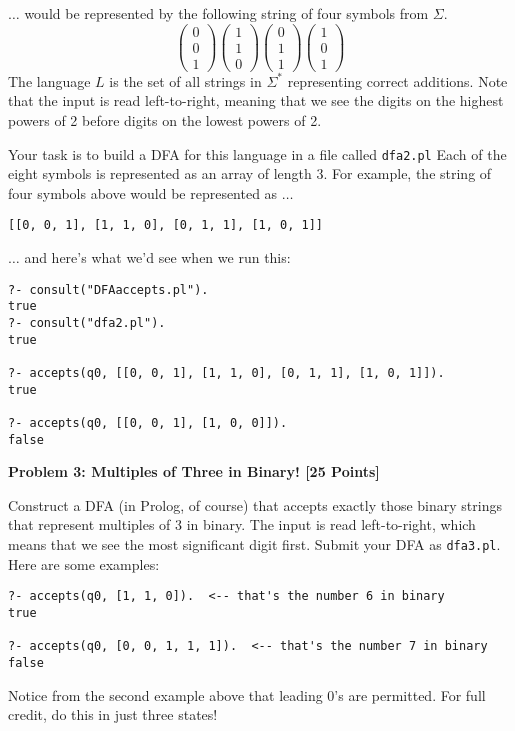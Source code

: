 \documentclass[12pt]{article}
\newcommand{\Problem}[3]{\mbox{} \newline \noindent \textbf{\textbf{Problem #1: #2 [#3 Points] \\ }}}
\begin{document}
$\dots$ would be represented by the following string of four symbols from 
$\Sigma$.
\[
\left( \begin{array}{c} 0 \\ 0 \\ 1 \end{array} \right)
\left( \begin{array}{c} 1 \\ 1 \\ 0 \end{array} \right)
\left( \begin{array}{c} 0 \\ 1 \\ 1 \end{array} \right)
\left( \begin{array}{c} 1 \\ 0 \\ 1 \end{array} \right)
\]
The language $L$ is the set of all strings in $\Sigma^{*}$ representing
correct additions.  Note that the input is read left-to-right, meaning that we see the digits on the highest powers of 2 before digits on the lowest powers of 2.

 Your task is to build a DFA for this language in a file called \verb+dfa2.pl+
Each of the eight symbols is represented as an array of length 3.  For example, the string of four symbols above would be represented 
as $\dots$
\begin{verbatim}
[[0, 0, 1], [1, 1, 0], [0, 1, 1], [1, 0, 1]]
\end{verbatim}
$\dots$ and here's what we'd see when we run this:
\begin{verbatim}
?- consult("DFAaccepts.pl").
true
?- consult("dfa2.pl").
true

?- accepts(q0, [[0, 0, 1], [1, 1, 0], [0, 1, 1], [1, 0, 1]]).
true

?- accepts(q0, [[0, 0, 1], [1, 0, 0]]).
false
\end{verbatim}

\Problem{3}{Multiples of Three in Binary!}{25}

Construct a DFA (in Prolog, of course) that accepts exactly those binary strings that represent multiples of 3 in binary.
The input is read left-to-right, which means that we see the most significant digit first.  Submit your DFA as \verb+dfa3.pl+.  Here are some examples:
\begin{verbatim}
?- accepts(q0, [1, 1, 0]).  <-- that's the number 6 in binary
true 

?- accepts(q0, [0, 0, 1, 1, 1]).  <-- that's the number 7 in binary
false
\end{verbatim}
Notice from the second example above that leading 0's are permitted.  For full credit, do this in just three states!
\end{document}
